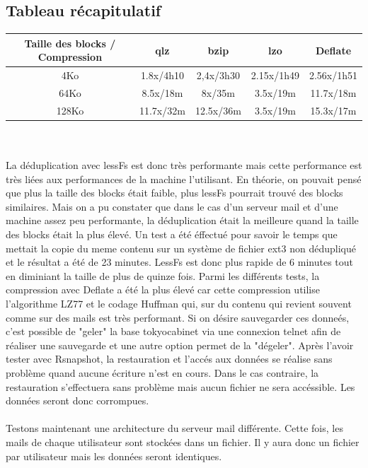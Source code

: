 \documentclass[a4paper]{report}
\begin{document}
		\subsection{Tableau récapitulatif}
			\begin{tabular}{|c|c|c|c|c|}
			  \hline
			  Taille des blocks / Compression & qlz & bzip & lzo & Deflate\\
			  \hline
			  4Ko & 1.8x/4h10 & 2,4x/3h30 & 2.15x/1h49 & 2.56x/1h51 \\
			  \hline
			  64Ko & 8.5x/18m & 8x/35m & 3.5x/19m & 11.7x/18m \\
			  \hline
			  128Ko & 11.7x/32m & 12.5x/36m & 3.5x/19m & 15.3x/17m\\ 
			   \hline
			\end{tabular}\\\\
			La déduplication avec lessFs est donc très performante mais cette performance est très liées aux performances de la machine l'utilisant. En théorie, on pouvait pensé que plus la taille des blocks était faible, plus lessFs pourrait trouvé des blocks similaires. Mais on a pu constater que dans le cas d'un serveur mail et d'une machine assez peu performante, la déduplication était la meilleure quand la taille des blocks était la plus élevé. Un test a été éffectué pour savoir le temps que mettait la copie du meme contenu sur un système de fichier ext3 non dédupliqué et le résultat a été de 23 minutes. LessFs est donc plus rapide de 6 minutes tout en diminiant la taille de plus de quinze fois. Parmi les différents tests, la compression avec Deflate a été la plus élevé car cette compression utilise l'algorithme LZ77 et le codage Huffman qui, sur du contenu qui revient souvent comme sur des mails est très performant. Si on désire sauvegarder ces donneés, c'est possible de "geler" la base tokyocabinet via une connexion telnet afin de réaliser une sauvegarde et une autre option permet de la "dégeler". Après l'avoir tester avec Rsnapshot, la restauration et l'accés aux données se réalise sans problème quand aucune écriture n'est en cours. Dans le cas contraire, la restauration s'effectuera sans problème mais aucun fichier ne sera accéssible. Les données seront donc corrompues.\\\\

			Testons maintenant une architecture du serveur mail différente. Cette fois, les mails de chaque utilisateur sont stockées dans un fichier. Il y aura donc un fichier par utilisateur mais les données seront identiques.
\end{document}
